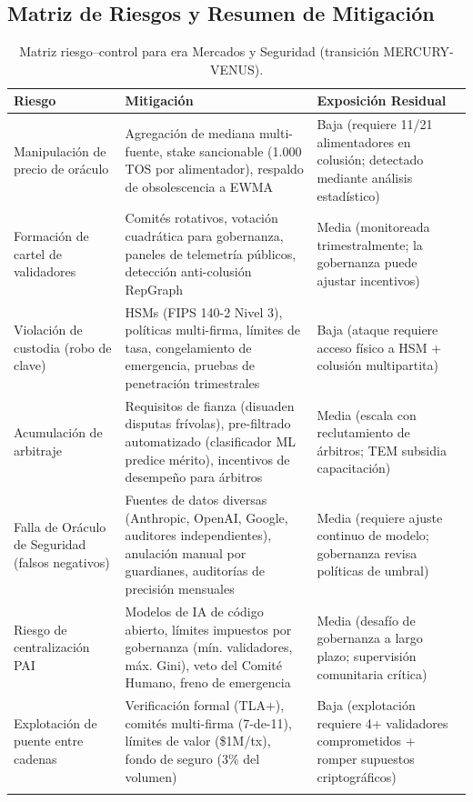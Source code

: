 \documentclass[11pt]{article}
\begin{document}
\subsection{Matriz de Riesgos y Resumen de Mitigación}
\begin{longtable}{@{}p{}p{}p{}@{}}
\toprule
\textbf{Riesgo} & \textbf{Mitigación} & \textbf{Exposición Residual} \\\midrule
Manipulación de precio de oráculo & Agregación de mediana multi-fuente, stake sancionable (1.000 TOS por alimentador), respaldo de obsolescencia a EWMA & Baja (requiere 11/21 alimentadores en colusión; detectado mediante análisis estadístico) \\
Formación de cartel de validadores & Comités rotativos, votación cuadrática para gobernanza, paneles de telemetría públicos, detección anti-colusión RepGraph & Media (monitoreada trimestralmente; la gobernanza puede ajustar incentivos) \\
Violación de custodia (robo de clave) & HSMs (FIPS 140-2 Nivel 3), políticas multi-firma, límites de tasa, congelamiento de emergencia, pruebas de penetración trimestrales & Baja (ataque requiere acceso físico a HSM + colusión multipartita) \\
Acumulación de arbitraje & Requisitos de fianza (disuaden disputas frívolas), pre-filtrado automatizado (clasificador ML predice mérito), incentivos de desempeño para árbitros & Media (escala con reclutamiento de árbitros; TEM subsidia capacitación) \\
Falla de Oráculo de Seguridad (falsos negativos) & Fuentes de datos diversas (Anthropic, OpenAI, Google, auditores independientes), anulación manual por guardianes, auditorías de precisión mensuales & Media (requiere ajuste continuo de modelo; gobernanza revisa políticas de umbral) \\
Riesgo de centralización PAI & Modelos de IA de código abierto, límites impuestos por gobernanza (mín. validadores, máx. Gini), veto del Comité Humano, freno de emergencia & Media (desafío de gobernanza a largo plazo; supervisión comunitaria crítica) \\
Explotación de puente entre cadenas & Verificación formal (TLA+), comités multi-firma (7-de-11), límites de valor (\$1M/tx), fondo de seguro (3\% del volumen) & Baja (explotación requiere 4+ validadores comprometidos + romper supuestos criptográficos) \\\bottomrule
\caption{Matriz riesgo--control para era Mercados y Seguridad (transición MERCURY-VENUS).}
\label{tab:risk-markets-expanded}
\end{longtable}
\end{document}
